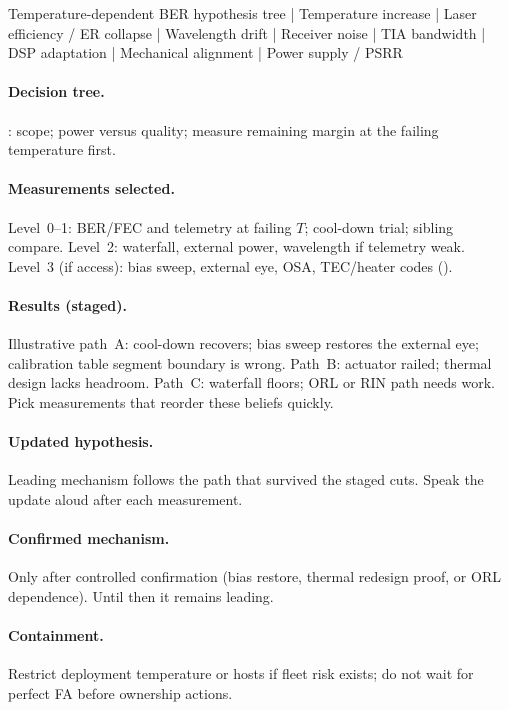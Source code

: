 \begin{dectree}
Temperature-dependent BER hypothesis tree
  |
Temperature increase
  |
Laser efficiency / ER collapse
  |
Wavelength drift
  |
Receiver noise
  |
TIA bandwidth
  |
DSP adaptation
  |
Mechanical alignment
  |
Power supply / PSRR
\end{dectree}

\paragraph{Decision tree.}
: scope; power versus
quality; measure remaining margin at the failing temperature first.

\paragraph{Measurements selected.}
Level~0--1: BER/FEC and telemetry at failing $T$; cool-down trial; sibling
compare. Level~2: waterfall, external power, wavelength if telemetry weak.
Level~3 (if access): bias sweep, external eye, OSA, TEC/heater codes
().

\paragraph{Results (staged).}
Illustrative path~A: cool-down recovers; bias sweep restores the external eye;
calibration table segment boundary is wrong. Path~B: actuator railed; thermal
design lacks headroom. Path~C: waterfall floors; ORL or RIN path needs work.
Pick measurements that reorder these beliefs quickly.

\paragraph{Updated hypothesis.}
Leading mechanism follows the path that survived the staged cuts. Speak the
update aloud after each measurement.

\paragraph{Confirmed mechanism.}
Only after controlled confirmation (bias restore, thermal redesign proof, or
ORL dependence). Until then it remains leading.

\paragraph{Containment.}
Restrict deployment temperature or hosts if fleet risk exists; do not wait for
perfect FA before ownership actions.

